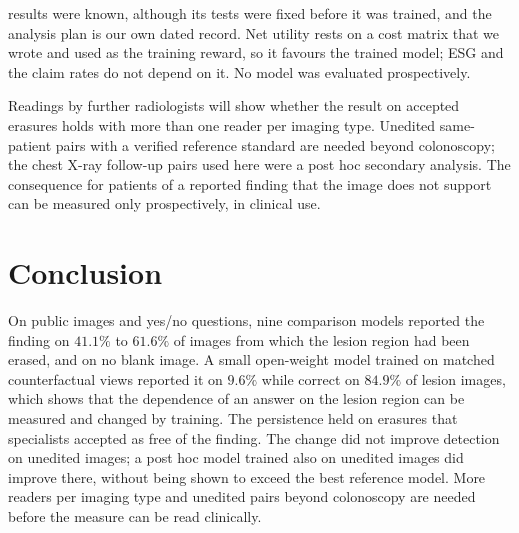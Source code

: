 results were known, although its tests were fixed before it was trained, and the analysis plan is our own dated record. Net utility rests on a cost matrix that we wrote and used as the training reward, so it favours the trained model; ESG and the claim rates do not depend on it. No model was evaluated prospectively.

Readings by further radiologists will show whether the result on accepted erasures holds with more than one reader per imaging type. Unedited same-patient pairs with a verified reference standard are needed beyond colonoscopy; the chest X-ray follow-up pairs used here were a post hoc secondary analysis. The consequence for patients of a reported finding that the image does not support can be measured only prospectively, in clinical use.

\section{Conclusion}\label{sec:conclusion}

On public images and yes/no questions, nine comparison models reported the finding on $41.1\%$ to $61.6\%$ of images from which the lesion region had been erased, and on no blank image. A small open-weight model trained on matched counterfactual views reported it on $9.6\%$ while correct on $84.9\%$ of lesion images, which shows that the dependence of an answer on the lesion region can be measured and changed by training. The persistence held on erasures that specialists accepted as free of the finding. The change did not improve detection on unedited images; a post hoc model trained also on unedited images did improve there, without being shown to exceed the best reference model. More readers per imaging type and unedited pairs beyond colonoscopy are needed before the measure can be read clinically.
